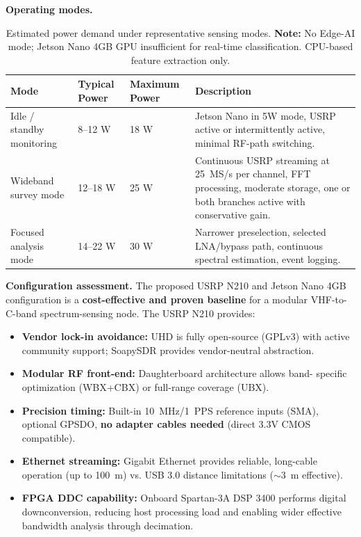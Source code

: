 \documentclass[11pt,a4paper]{article}
\begin{document}
	\noindent
	\textbf{Operating modes.}
	\begin{table}[htbp]
		\centering
		\small
		\begin{tabular}{p{4.0cm}p{3.0cm}p{3.0cm}p{5.0cm}}
			\toprule
			\textbf{Mode} &
			\textbf{Typical Power} &
			\textbf{Maximum Power} &
			\textbf{Description} \\
			\midrule
			
			Idle / standby monitoring &
			8--12 W &
			18 W &
			Jetson Nano in 5W mode, USRP active or intermittently active,
			minimal RF-path switching. \\
			
			Wideband survey mode &
			12--18 W &
			25 W &
			Continuous USRP streaming at 25~MS/s per channel, FFT processing,
			moderate storage, one or both branches active with conservative gain. \\
			
			Focused analysis mode &
			14--22 W &
			30 W &
			Narrower preselection, selected LNA/bypass path, continuous spectral
			estimation, event logging. \\
			
			\bottomrule
		\end{tabular}
		\caption{Estimated power demand under representative sensing modes.
			\textbf{Note:} No Edge-AI mode; Jetson Nano 4GB GPU insufficient for
			real-time classification. CPU-based feature extraction only.}
		\label{tab:power-operating-modes}
	\end{table}
	
	\noindent
	\textbf{Configuration assessment.}
	The proposed USRP N210 and Jetson Nano 4GB configuration is a
	\textbf{cost-effective and proven baseline} for a modular VHF-to-C-band
	spectrum-sensing node. The USRP N210 provides:
	\begin{itemize}
		\item \textbf{Vendor lock-in avoidance:} UHD is fully open-source (GPLv3) with
		active community support; SoapySDR provides vendor-neutral abstraction.
		\item \textbf{Modular RF front-end:} Daughterboard architecture allows band-
		specific optimization (WBX+CBX) or full-range coverage (UBX).
		\item \textbf{Precision timing:} Built-in 10~MHz/1~PPS reference inputs (SMA),
		optional GPSDO, \textbf{no adapter cables needed} (direct 3.3V CMOS compatible).
		\item \textbf{Ethernet streaming:} Gigabit Ethernet provides reliable, long-cable
		operation (up to 100~m) vs. USB 3.0 distance limitations ($\sim$3~m effective).
		\item \textbf{FPGA DDC capability:} Onboard Spartan-3A DSP 3400 performs digital
		downconversion, reducing host processing load and enabling wider effective
		bandwidth analysis through decimation.
	\end{itemize}
	
\end{document}
